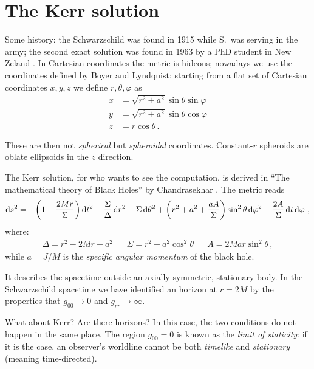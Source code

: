 \documentclass[main.tex]{subfiles}
\begin{document}
\section{The Kerr solution}


Some history: the Schwarzschild was found in 1915 while S.\ was serving in the army; the second exact solution was found in 1963 by a PhD student in New Zeland \cite[]{kerrGravitationalFieldSpinning1963}.
In Cartesian coordinates the metric is hideous; nowadays we use the coordinates defined by Boyer and Lyndquist: starting from a flat set of Cartesian coordinates \(x, y, z\) we define \(r, \theta , \varphi \) as
%
\begin{align}
x &= \sqrt{r^2 + a^2} \sin \theta \sin \varphi   \\
y &= \sqrt{r^2 + a^2} \sin \theta \cos \varphi  \\
z &= r \cos \theta 
\,.
\end{align}

These are then not \emph{spherical} but \emph{spheroidal} coordinates. 
Constant-\(r\) spheroids are oblate ellipsoids in the \(z\) direction.

The Kerr solution, for who wants to see the computation, is derived in ``The mathematical theory of Black Holes'' by Chandrasekhar \cite[]{chandrasekharMathematicalTheoryBlack1998}.  
The metric reads 
%
\begin{align}
\dd{s^2} = - \qty(1 - \frac{2Mr}{\Sigma }) \dd{t^2}
+ \frac{\Sigma }{\Delta } \dd{r^2} 
+ \Sigma \dd{\theta ^2} 
+ \qty(r^2 + a^2 + \frac{aA}{\Sigma }) \sin^2 \theta \dd{\varphi^2} 
- \frac{2A}{\Sigma } \dd{t} \dd{\varphi }
\,,
\end{align}
%
where: 
%
\begin{align}
\Delta = r^2 - 2Mr + a^2
&&
\Sigma = r^2 + a^2 \cos^2 \theta 
&&
A = 2Mar \sin^2 \theta 
\,,
\end{align}
%
while \(a = J / M\) is the \emph{specific angular momentum} of the black hole. 

It describes the spacetime outside an axially symmetric, stationary body. 
In the Schwarzschild spacetime we have identified an horizon at \(r = 2M\) by the properties that \(g_{00} \to 0\) and \(g_{rr} \to \infty \). 

What about Kerr? Are there horizons? In this case, the two conditions do not happen in the same place. 
The region \(g_{00} = 0\) is known as the \emph{limit of staticity}: if it is the case, an observer's worldline cannot be both \emph{timelike} and \emph{stationary} (meaning time-directed). 
\end{document}
